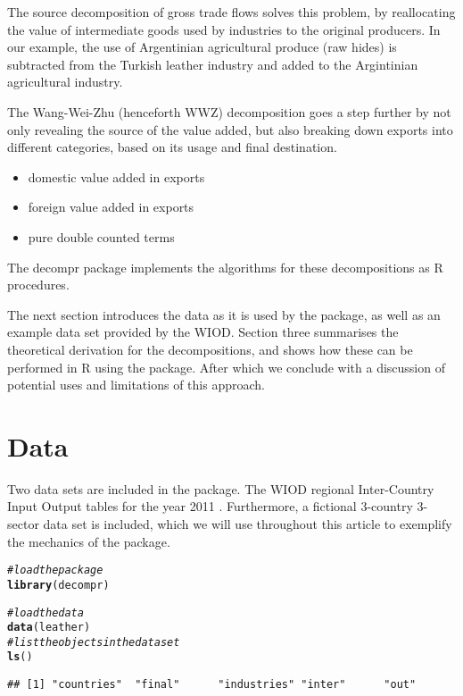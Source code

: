 \documentclass{article}\usepackage[]{graphicx}\usepackage[]{color}
\makeatletter
\newcommand{\hlcom}[1]{\textcolor[rgb]{0.678,0.584,0.686}{\textit{#1}}}%
\newcommand{\hlstd}[1]{\textcolor[rgb]{0.345,0.345,0.345}{#1}}%
\newcommand{\hlkwd}[1]{\textcolor[rgb]{0.737,0.353,0.396}{\textbf{#1}}}%
\newenvironment{kframe}{%
 \def\at@end@of@kframe{}%
 \ifinner\ifhmode%
  \def\at@end@of@kframe{\end{minipage}}%
  \begin{minipage}{\columnwidth}%
 \fi\fi%
 \def\FrameCommand##1{\hskip\@totalleftmargin \hskip-\fboxsep
 \colorbox{shadecolor}{##1}\hskip-\fboxsep
     \hskip-\linewidth \hskip-\@totalleftmargin \hskip\columnwidth}%
 \MakeFramed {\advance\hsize-\width
   \@totalleftmargin\z@ \linewidth\hsize
   \@setminipage}}%
 {\par\unskip\endMakeFramed%
 \at@end@of@kframe}
\newenvironment{knitrout}{}{} %
\makeatother
\begin{document}
The source decomposition of gross trade flows solves this problem,
by reallocating the value of intermediate goods used by industries to the original producers.
In our example, the use of Argentinian agricultural produce (raw hides)
is subtracted from the Turkish leather industry and added to the Argintinian agricultural industry.

The Wang-Wei-Zhu (henceforth WWZ) decomposition goes a step further by not only revealing the source of the value added,
but also breaking down exports into different categories, based on its usage and final destination.

\begin{itemize}
 \item domestic value added in exports
 \item foreign value added in exports
 \item pure double counted terms
\end{itemize}

The decompr package implements the algorithms for these decompositions as R procedures.

The next section introduces the data as it is used by the package,
as well as an example data set provided by the WIOD.
Section three summarises the theoretical derivation for the decompositions,
and shows how these can be performed in R using the package.
After which we conclude with a discussion of potential uses and limitations of this approach.

\section{Data}
Two data sets are included in the package.
The WIOD regional Inter-Country Input Output tables for the year 2011 \parencite{timmer2012world}. 
Furthermore, a fictional 3-country 3-sector data set is included, which we will use throughout this article to exemplify the mechanics of the package.

\begin{knitrout}
\color{fgcolor}\begin{kframe}
\begin{alltt}
\hlcom{# load the package}
\hlkwd{library}\hlstd{(decompr)}
\end{alltt}
\end{kframe}
\end{knitrout}

\begin{knitrout}
\color{fgcolor}\begin{kframe}
\begin{alltt}
\hlcom{# load the data}
\hlkwd{data}\hlstd{(leather)}
\hlcom{# list the objects in the data set}
\hlkwd{ls}\hlstd{()}
\end{alltt}
\begin{verbatim}
## [1] "countries"  "final"      "industries" "inter"      "out"
\end{verbatim}
\end{kframe}
\end{knitrout}
\end{document}
